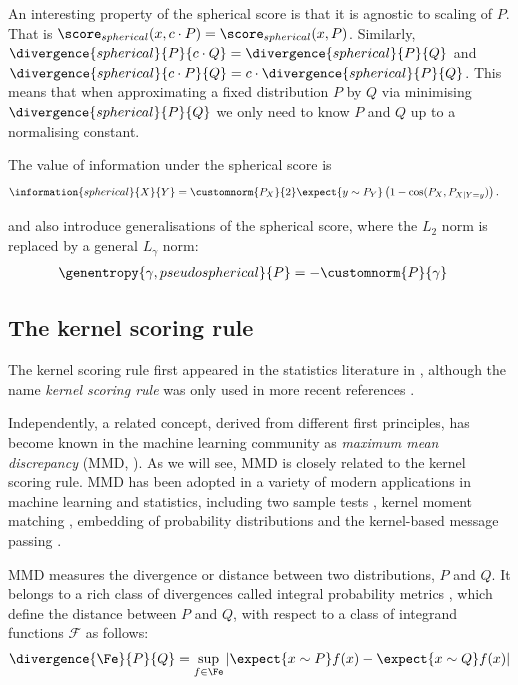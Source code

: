 An interesting property of the spherical score is that it is agnostic to scaling of $P$. That is $\score_{spherical}(x,c\cdot P) = \score_{spherical}(x,P) $. Similarly, $\divergence{spherical}{P}{c\cdot Q} = \divergence{spherical}{P}{Q}$ and $\divergence{spherical}{c\cdot P}{Q} = c \cdot \divergence{spherical}{P}{Q}$. This means that when approximating a fixed distribution $P$ by $Q$ via minimising $\divergence{spherical}{P}{Q}$ we only need to know $P$ and $Q$ up to a normalising constant.

The value of information under the spherical score is
%
\begin{align}
	\information{spherical}{X}{Y} &= \customnorm{P_X}{2}\expect{y \sim P_{Y}} \left( 1 - \cos(P_X,P_{X\vert Y=y}) \right).
\end{align}

\citet{Gneiting2007} and \citet{Jose2008} also introduce generalisations of the spherical score, where the $L_2$ norm is replaced by a general $L_\gamma$ norm:
%
\begin{align}
	\genentropy{\gamma,pseudospherical}{P} &= -\customnorm{P}{\gamma}
\end{align}

\subsection{The kernel scoring rule\label{sec:kernel_score}}

The kernel scoring rule first appeared in the statistics literature in \citep{Eaton1996}, although the name \emph{kernel scoring rule} was only used in more recent references \citep{Dawid1994,Dawid2007,Gneiting2007}.

Independently, a related concept, derived from different first principles, has become known in the machine learning community as \emph{maximum mean discrepancy} (MMD, \citep{Sriperumbudur2008}). As we will see, MMD is closely related to the kernel scoring rule. MMD has been adopted in a variety of modern applications in machine learning and statistics, including two sample tests \citep{Gretton2012}, kernel moment matching \citep{Song2008}, embedding of probability distributions \citep{Smola2007} and the kernel-based message passing \citep{Fukumizu2010}.

MMD measures the divergence or distance between two distributions, $P$ and $Q$. It belongs to a rich class of divergences called integral probability metrics \citep{Sriperumbudur2009}, which define the distance between  $P$ and $Q$, with respect to a class of integrand functions $\mathcal{F}$ as follows:
%
\begin{align}
	\divergence{\Fe}{P}{Q} = \sup_{f\in\Fe}\left\vert \expect{x\sim P} f(x) - \expect{x\sim Q} f(x) \right\vert
\end{align}
	
